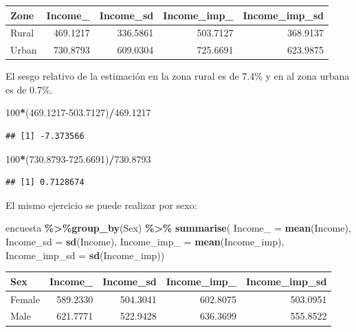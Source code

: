\documentclass[
  spanish,
  12pt,
]{book}
\newenvironment{Shaded}{\begin{snugshade}}{\end{snugshade}}
\newcommand{\AttributeTok}[1]{\textcolor[rgb]{0.13,0.29,0.53}{#1}}
\newcommand{\DecValTok}[1]{\textcolor[rgb]{0.00,0.00,0.81}{#1}}
\newcommand{\FloatTok}[1]{\textcolor[rgb]{0.00,0.00,0.81}{#1}}
\newcommand{\FunctionTok}[1]{\textcolor[rgb]{0.13,0.29,0.53}{\textbf{#1}}}
\newcommand{\NormalTok}[1]{#1}
\newcommand{\SpecialCharTok}[1]{\textcolor[rgb]{0.81,0.36,0.00}{\textbf{#1}}}
\begin{document}
\begin{tabular}{l|r|r|r|r}
\hline
Zone & Income\_ & Income\_sd & Income\_imp\_ & Income\_imp\_sd\\
\hline
Rural & 469.1217 & 336.5861 & 503.7127 & 368.9137\\
\hline
Urban & 730.8793 & 609.0304 & 725.6691 & 623.9875\\
\hline
\end{tabular}

El sesgo relativo de la estimación en la zona rural es de 7.4\% y en al zona urbana es de 0.7\%.

\begin{Shaded}
\begin{Highlighting}[]
\DecValTok{100}\SpecialCharTok{*}\NormalTok{(}\FloatTok{469.1217{-}503.7127}\NormalTok{)}\SpecialCharTok{/}\FloatTok{469.1217}
\end{Highlighting}
\end{Shaded}

\begin{verbatim}
## [1] -7.373566
\end{verbatim}

\begin{Shaded}
\begin{Highlighting}[]
\DecValTok{100}\SpecialCharTok{*}\NormalTok{(}\FloatTok{730.8793{-}725.6691}\NormalTok{)}\SpecialCharTok{/}\FloatTok{730.8793}
\end{Highlighting}
\end{Shaded}

\begin{verbatim}
## [1] 0.7128674
\end{verbatim}

El mismo ejercicio se puede realizar por sexo:

\begin{Shaded}
\begin{Highlighting}[]
\NormalTok{encuesta }\SpecialCharTok{\%\textgreater{}\%}\FunctionTok{group\_by}\NormalTok{(Sex) }\SpecialCharTok{\%\textgreater{}\%}  \FunctionTok{summarise}\NormalTok{(}
  \AttributeTok{Income\_ =} \FunctionTok{mean}\NormalTok{(Income),}
  \AttributeTok{Income\_sd =} \FunctionTok{sd}\NormalTok{(Income),}
  \AttributeTok{Income\_imp\_ =} \FunctionTok{mean}\NormalTok{(Income\_imp),}
  \AttributeTok{Income\_imp\_sd =} \FunctionTok{sd}\NormalTok{(Income\_imp))}
\end{Highlighting}
\end{Shaded}

\begin{tabular}{l|r|r|r|r}
\hline
Sex & Income\_ & Income\_sd & Income\_imp\_ & Income\_imp\_sd\\
\hline
Female & 589.2330 & 504.3041 & 602.8075 & 503.0951\\
\hline
Male & 621.7771 & 522.9428 & 636.3699 & 555.8522\\
\hline
\end{tabular}
\end{document}
